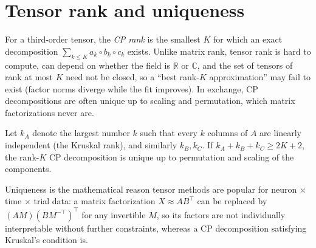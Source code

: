 \section{Tensor rank and uniqueness}
For a third-order tensor, the \emph{CP rank} is the smallest $K$ for which an exact decomposition $\sum_{k\le K}a_k\circ b_k\circ c_k$ exists. Unlike matrix rank, tensor rank is hard to compute, can depend on whether the field is $\mathbb R$ or $\mathbb C$, and the set of tensors of rank at most $K$ need not be closed, so a ``best rank-$K$ approximation'' may fail to exist (factor norms diverge while the fit improves). In exchange, CP decompositions are often unique up to scaling and permutation, which matrix factorizations never are.

\begin{theorem}
Let $k_A$ denote the largest number $k$ such that every $k$ columns of $A$ are linearly independent (the Kruskal rank), and similarly $k_B,k_C$. If $k_A+k_B+k_C\ge2K+2$, the rank-$K$ CP decomposition is unique up to permutation and scaling of the components.
\end{theorem}
Uniqueness is the mathematical reason tensor methods are popular for neuron $\times$ time $\times$ trial data: a matrix factorization $X\approx AB^\top$ can be replaced by $(AM)(BM^{-\top})^\top$ for any invertible $M$, so its factors are not individually interpretable without further constraints, whereas a CP decomposition satisfying Kruskal's condition is.

